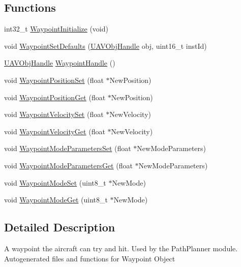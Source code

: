 \subsection*{\-Functions}
\begin{DoxyCompactItemize}
\item 
int32\-\_\-t \hyperlink{group___waypoint_ga5d5a53e0ff19273674e7bbd26aae13cc}{\-Waypoint\-Initialize} (void)
\item 
void \hyperlink{group___waypoint_ga2bbc0cab2b9dca2907f756a77fde2a38}{\-Waypoint\-Set\-Defaults} (\hyperlink{targets_2_u_a_v_objects_2inc_2uavobjectmanager_8h_a279053e22be53ce9f895043aaeb91e3b}{\-U\-A\-V\-Obj\-Handle} obj, uint16\-\_\-t inst\-Id)
\item 
\hyperlink{targets_2_u_a_v_objects_2inc_2uavobjectmanager_8h_a279053e22be53ce9f895043aaeb91e3b}{\-U\-A\-V\-Obj\-Handle} \hyperlink{group___waypoint_gada9117d2b715f21cd392e52a64ef0684}{\-Waypoint\-Handle} ()
\item 
void \hyperlink{group___waypoint_ga03378f9160c372cb2cb9744506216f9f}{\-Waypoint\-Position\-Set} (float $\ast$\-New\-Position)
\item 
void \hyperlink{group___waypoint_ga33ff172bc4ff60fdea19af6d7e0910f2}{\-Waypoint\-Position\-Get} (float $\ast$\-New\-Position)
\item 
void \hyperlink{group___waypoint_gaa3fc970d072d0e3403c974e68166a03f}{\-Waypoint\-Velocity\-Set} (float $\ast$\-New\-Velocity)
\item 
void \hyperlink{group___waypoint_gab9cb89f5aad4a261b55ca670fa804ad8}{\-Waypoint\-Velocity\-Get} (float $\ast$\-New\-Velocity)
\item 
void \hyperlink{group___waypoint_gaaf1fc736da1aa941e997cc14549abaf8}{\-Waypoint\-Mode\-Parameters\-Set} (float $\ast$\-New\-Mode\-Parameters)
\item 
void \hyperlink{group___waypoint_ga67a94bc592dc7843dcdbbc62860f5e7c}{\-Waypoint\-Mode\-Parameters\-Get} (float $\ast$\-New\-Mode\-Parameters)
\item 
void \hyperlink{group___waypoint_ga4ee2234a6dfa10d9df956f40a124f92d}{\-Waypoint\-Mode\-Set} (uint8\-\_\-t $\ast$\-New\-Mode)
\item 
void \hyperlink{group___waypoint_gabe2fa92c2251934b513d6949bc20405a}{\-Waypoint\-Mode\-Get} (uint8\-\_\-t $\ast$\-New\-Mode)
\end{DoxyCompactItemize}


\subsection{\-Detailed \-Description}
\-A waypoint the aircraft can try and hit. \-Used by the \-Path\-Planner module. \-Autogenerated files and functions for \-Waypoint \-Object 

